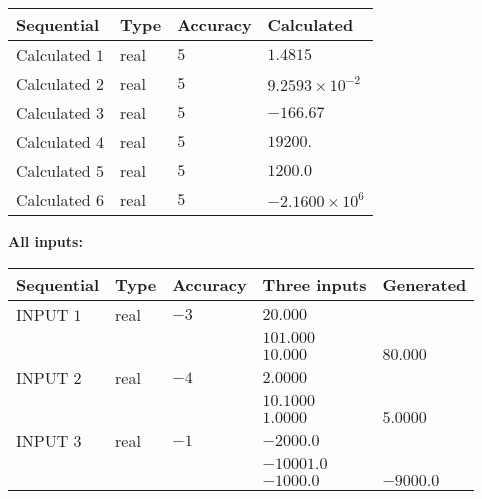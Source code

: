 \documentclass[12pt]{article}
\begin{document}
  
\noindent\begin{tabular}{|l|l|l|l|}
\hline
 Sequential & Type & Accuracy & Calculated \\ 
\hline
 
 
  Calculated $           1$ & real & $           5 $ & 
 $ 1.4815 $ 
 \\  \hline  
 
 
  Calculated $           2$ & real & $           5 $ & 
 $ 9.2593 \times 10^{-2} $ 
 \\  \hline  
 
 
  Calculated $           3$ & real & $           5 $ & 
 $ -166.67 $ 
 \\  \hline  
 
 
  Calculated $           4$ & real & $           5 $ & 
 $ 19200. $ 
 \\  \hline  
 
 
  Calculated $           5$ & real & $           5 $ & 
 $ 1200.0 $ 
 \\  \hline  
 
 
  Calculated $           6$ & real & $           5 $ & 
 $ -2.1600 \times 10^{6} $ 
 \\  \hline  
 \end{tabular}
   
   
   
   
\noindent\vspace{0.1in}\hspace{-0.08in} {\textbf{\Large{All inputs: }}}
   
   
  
  
\noindent\begin{tabular}{|l|l|l|l|l|}
\hline
 Sequential & Type & Accuracy & Three inputs & Generated \\ 
\hline
 
 
  INPUT $           1$ & real & $          -3 $ & $
 20.000
  $ & \\
  & & &  $
 101.000
  $ & \\
  & & &  $
 10.000
 $ & $ 80.000 $ 
 \\  \hline  
 
 
  INPUT $           2$ & real & $          -4 $ & $
 2.0000
  $ & \\
  & & &  $
 10.1000
  $ & \\
  & & &  $
 1.0000
 $ & $ 5.0000 $ 
 \\  \hline  
 
 
  INPUT $           3$ & real & $          -1 $ & $
 -2000.0
  $ & \\
  & & &  $
 -10001.0
  $ & \\
  & & &  $
 -1000.0
 $ & $ -9000.0 $ 
 \\  \hline  
 \end{tabular}
   
\end{document}
